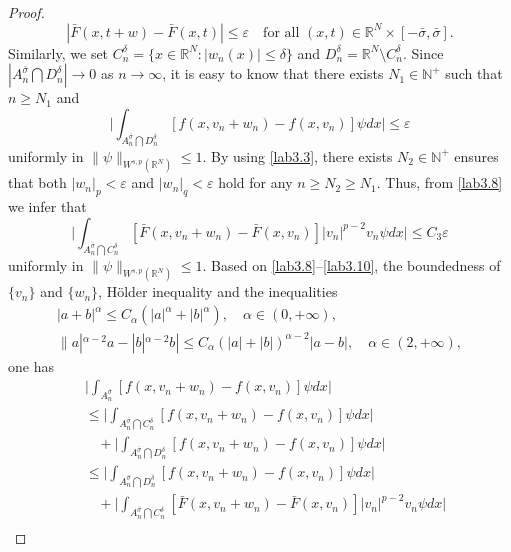 \documentclass[reqno]{amsart}
\begin{document}
\begin{proof}
\begin{equation}\label{lab3.8}
|\bar{F}(x,t+w)-\bar{F}(x,t)|\leq\varepsilon\quad \text{for all }
  (x,t)\in\mathbb{R}^N\times[-\bar{\sigma}, \bar{\sigma}].
\end{equation}
Similarly, we set $C^\delta_n=\{x\in\mathbb{R}^N: |w_n(x)|\leq\delta \}$ and 
$D^\delta_n=\mathbb{R}^N\setminus C^\delta_n$. 
Since $|A^{\bar{\sigma}}_n\bigcap D^\delta_n|\to 0$ as $n\to \infty$, 
it is easy to know that there exists $N_1\in \mathbb{N}^+$ such that $n\geq N_1$ and
\begin{equation}\label{lab3.9}
\Big|\int_{A^{\bar{\sigma}}_n\bigcap D^\delta_n} [f(x,v_n+w_n)
-f(x,v_n)]\psi dx\Big|\leq\varepsilon
\end{equation}
uniformly in $\|\psi\|_{W^{s,p}(\mathbb{R}^N)}\leq1$. 
By using \eqref{lab3.3}, there exists $N_2\in \mathbb{N}^+$ ensures that both 
$|w_n|_p<\varepsilon$ and $|w_n|_q<\varepsilon$ hold for any $n\geq N_2\geq N_1$. 
Thus, from \eqref{lab3.8} we infer that
\begin{equation}\label{lab3.10}
\Big|\int_{A^{\bar{\sigma}}_n\bigcap C^\delta_n} [\bar{F}(x,v_n+w_n)
-\bar{F}(x,v_n)]|v_n|^{p-2}v_n\psi dx\Big|\leq C_3\varepsilon
\end{equation}
uniformly in $\|\psi\|_{W^{s,p}(\mathbb{R}^N)}\leq1$. 
Based on \eqref{lab3.8}--\eqref{lab3.10}, the boundedness of $\{v_n\}$ and 
$\{w_n\}$, H\"older inequality and the  inequalities
\begin{equation}\label{lab3.11}
\begin{gathered}
|a+b|^\alpha\leq C_{\alpha}(|a|^\alpha+|b|^\alpha), \quad \alpha\in(0, +\infty),  \\
\|a|^{\alpha-2}a-|b|^{\alpha-2}b|\leq C_\alpha(|a|+|b|)^{\alpha-2}|a-b|, \quad
 \alpha\in(2, +\infty), 
\end{gathered}
\end{equation}
one has
\begin{align*}
&\Big|\int_{A^{\bar{\sigma}}_n} [f(x,v_n+w_n)-f(x,v_n)]\psi dx\Big|   \\
&\leq\Big|\int_{A^{\bar{\sigma}}_n\bigcap C^\delta_n} [f(x,v_n+w_n)-f(x,v_n)]\psi dx\Big|  \\
&\ \ \ \ +\Big|\int_{A^{\bar{\sigma}}_n\bigcap D^\delta_n} [f(x,v_n+w_n)-f(x,v_n)]\psi dx\Big|   \\
&\leq\Big|\int_{A^{\bar{\sigma}}_n\bigcap D^\delta_n} [f(x,v_n+w_n)-f(x,v_n)]\psi dx\Big|   \\
&\ \ \ \ +\Big|\int_{A^{\bar{\sigma}}_n\bigcap C^\delta_n} [\bar{F}(x,v_n+w_n)-\bar{F}(x,v_n)]|v_n|^{p-2}v_n\psi dx\Big|   \\

\end{align*}
\end{proof}
\end{document}
